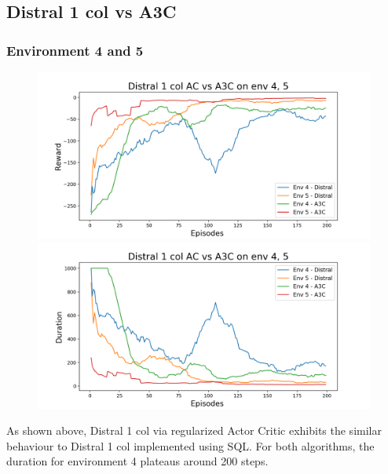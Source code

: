 \documentclass[12pt]{report}
\begin{document}
\subsection{Distral 1 col vs A3C}
\subsubsection{Environment 4 and 5}
\begin{figure}[H]
\centering
\begin{minipage}{.5\textwidth}
\centering
\includegraphics[width=\textwidth]{figs/d1_col_ac/d1_col_ac_4_5_rwd.png}
\end{minipage}%
\centering
\begin{minipage}{.5\textwidth}
\centering
\includegraphics[width=\textwidth]{figs/d1_col_ac/d1_col_ac_4_5_dur.png}
\end{minipage}%
\end{figure}
As shown above, Distral 1 col via regularized Actor Critic exhibits the similar behaviour to Distral 1 col implemented using SQL. For both algorithms, the duration for environment 4 plateaus around 200 steps. 
\end{document}
